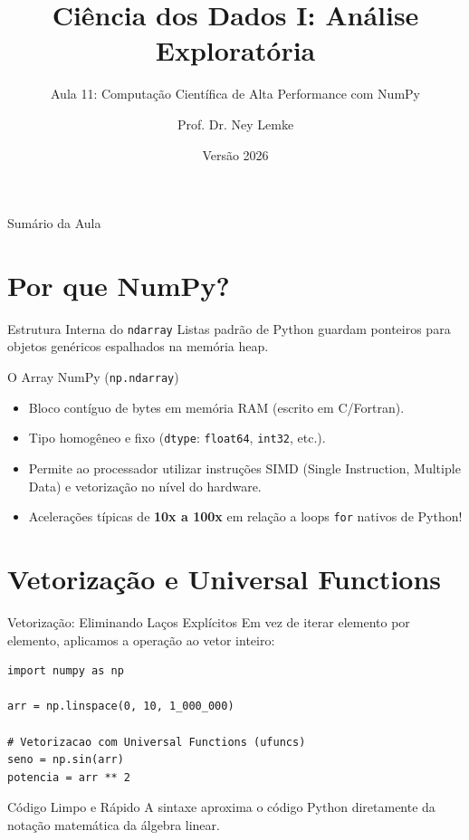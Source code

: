 \documentclass[aspectratio=169, 10pt]{beamer}
\title[Aula 11 - NumPy Vetorial]{Ciência dos Dados I: Análise Exploratória}
\subtitle{Aula 11: Computação Científica de Alta Performance com NumPy}
\author{Prof. Dr. Ney Lemke}
\institute{UNESP -- Instituto de Biociências de Botucatu}
\date{Versão 2026}
\begin{document}
\frame{\titlepage}

\begin{frame}{Sumário da Aula}
  \tableofcontents
\end{frame}

\section{Por que NumPy?}

\begin{frame}{Estrutura Interna do \texttt{ndarray}}
  Listas padrão de Python guardam ponteiros para objetos genéricos espalhados na memória heap.
  \begin{block}{O Array NumPy (\texttt{np.ndarray})}
    \begin{itemize}
      \item Bloco contíguo de bytes em memória RAM (escrito em C/Fortran).
      \item Tipo homogêneo e fixo (\texttt{dtype}: \texttt{float64}, \texttt{int32}, etc.).
      \item Permite ao processador utilizar instruções SIMD (Single Instruction, Multiple Data) e vetorização no nível do hardware.
      \item Acelerações típicas de \textbf{10x a 100x} em relação a loops \texttt{for} nativos de Python!
    \end{itemize}
  \end{block}
\end{frame}

\section{Vetorização e Universal Functions}

\begin{frame}[fragile]{Vetorização: Eliminando Laços Explícitos}
  Em vez de iterar elemento por elemento, aplicamos a operação ao vetor inteiro:
  \begin{lstlisting}
import numpy as np

arr = np.linspace(0, 10, 1_000_000)

# Vetorizacao com Universal Functions (ufuncs)
seno = np.sin(arr)
potencia = arr ** 2
  \end{lstlisting}
  \begin{exampleblock}{Código Limpo e Rápido}
    A sintaxe aproxima o código Python diretamente da notação matemática da álgebra linear.
  \end{exampleblock}
\end{frame}
\end{document}
